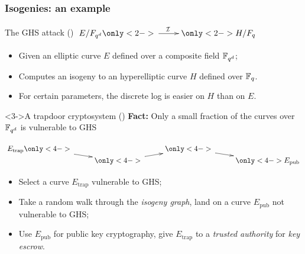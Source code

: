 \documentclass[10pt]{beamer}
\begin{document}
\begin{frame}
  \frametitle{Isogenies: an example}

  \vspace{-1mm}

  \begin{block}{The GHS attack (\cite{gaudry+hess+smart02})}
    \centering
    $\xymatrix{
      E/F_{q^d} \only<2->{\ar[r]^\I} & \only<2->{H/F_q}
    }$
    \begin{itemize}
    \item Given an elliptic curve $E$ defined over a composite field $\mathbb{F}_{q^d}$;
    \item<2-> Computes an isogeny to an hyperelliptic curve $H$
      defined over $\mathbb{F}_q$.
    \item<2-> For certain parameters, the discrete log is easier on
      $H$ than on $E$.
    \end{itemize}
  \end{block}

  \vspace{-0.3mm}

  \begin{block}<3->{A trapdoor cryptosystem (\cite{teske06})}
    \textbf{Fact:} Only a small fraction of the curves over $\mathbb{F}_{q^d}$
    is vulnerable to GHS

    \centering
    $\xymatrix@R=0pt{
      E_{\mathrm{trap}} \only<4->{\ar[dr]} &         & \only<4->{\ar[dr]} &\\
      & \only<4->{\ar[ur]} &         & \only<4->{E_{\mathrm{pub}}}
    }$
    \begin{itemize}
    \item Select a curve $E_{\mathrm{trap}}$ vulnerable to GHS;
    \item<4-> Take a random walk through the \emph{isogeny graph},
      land on a curve $E_{\mathrm{pub}}$ not vulnerable to GHS;
    \item<5-> Use $E_{\mathrm{pub}}$ for public key cryptography, give
      $E_{\mathrm{trap}}$ to a \emph{trusted authority} for \emph{key
        escrow}.
    \end{itemize}
  \end{block}
\end{frame}

\end{document}
